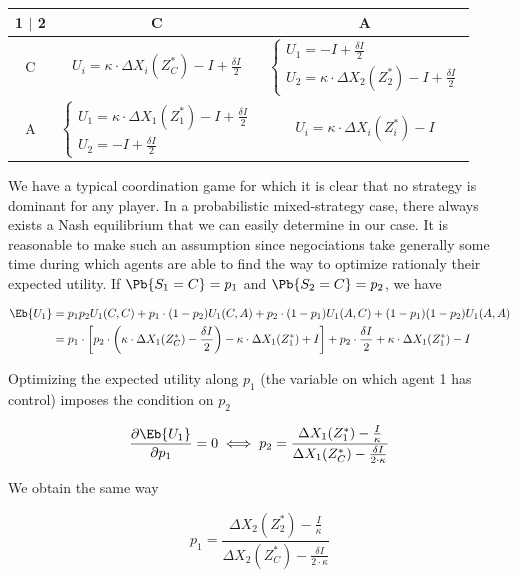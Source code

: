 \begin{itemize}
\medskip
\hfill
\begin{tabular}{ |c|c|c| } 

 \hline
 1 $|$ 2  & C & A \\ \hline
 C & $U_i = \kappa \cdot \Delta X_i(Z^{\ast}_C) - I + \frac{\delta I}{2}$
   & $\begin{cases}U_1 = -I + \frac{\delta I}{2} \\U_2 = \kappa \cdot \Delta X_2(Z^{\ast}_2)-I + \frac{\delta I}{2}\end{cases}$ \\ \hline
 A & $\begin{cases}U_1 = \kappa \cdot \Delta X_1(Z^{\ast}_1)-I + \frac{\delta I}{2}\\U_2 = -I + \frac{\delta I}{2}\end{cases}$
   & $U_i = \kappa \cdot \Delta X_i(Z^{\ast}_i) - I$ \\
 \hline
\end{tabular}
\hfill\hfill
\medskip

We have a typical coordination game for which it is clear that no strategy is dominant for any player. In a probabilistic mixed-strategy case, there always exists a Nash equilibrium that we can easily determine in our case. It is reasonable to make such an assumption since negociations take generally some time during which agents are able to find the way to optimize rationaly their expected utility. If $\Pb{S_1=C} = p_1$ and $\Pb{S_2=C} = p_2$, we have

\[
\begin{split}
\Eb{U_1} & =p_1 p_2 U_1(C,C) + p_1\cdot (1-p_2) U_1(C,A) + p_2 \cdot (1-p_1) U_1(A,C) + (1-p_1)(1-p_2) U_1(A,A)\\
& = p_1 \cdot \left[ p_2 \cdot \left(\kappa \cdot \Delta X_1(Z^{\ast}_C) - \frac{\delta I}{2} \right) - \kappa \cdot \Delta X_1(Z^{\ast}_1) + I\right] + p_2\cdot\frac{\delta I}{2} + \kappa\cdot\Delta X_1(Z^{\ast}_1)-I
\end{split}
\]

Optimizing the expected utility along $p_1$ (the variable on which agent 1 has control) imposes the condition on $p_2$

\[
\frac{\partial \Eb{U_1}}{\partial p_1} = 0 \iff p_2 = \frac{\Delta X_1(Z^{\ast}_1)-\frac{I}{\kappa}}{\Delta X_1(Z^{\ast}_C) - \frac{\delta I}{2\cdot \kappa}}
\]

We obtain the same way

\[
p_1 = \frac{\Delta X_2(Z^{\ast}_2)-\frac{I}{\kappa}}{\Delta X_2(Z^{\ast}_C) - \frac{\delta I}{2\cdot\kappa}}
\]


\end{itemize}
